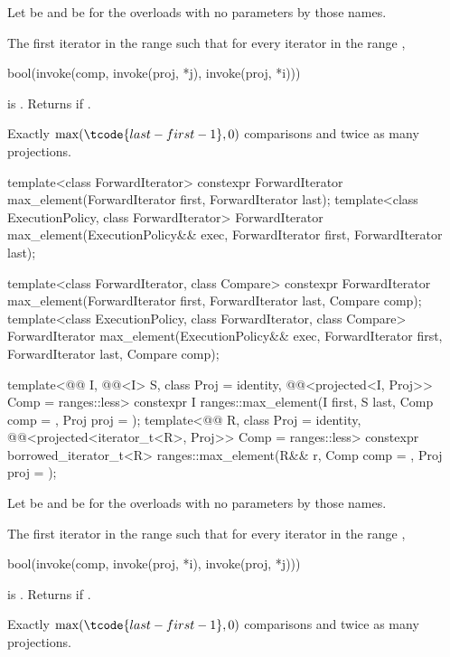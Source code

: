 \begin{itemdescr}
\pnum
Let  be 
and  be 
for the overloads with no parameters by those names.

\pnum
\returns
The first iterator  in the range 
such that for every iterator  in the range ,
\begin{codeblock}
bool(invoke(comp, invoke(proj, *j), invoke(proj, *i)))
\end{codeblock}
is .
Returns  if .

\pnum
\complexity
Exactly $\max(\tcode{last - first - 1}, 0)$ comparisons and
twice as many projections.
\end{itemdescr}

%
\begin{itemdecl}
template<class ForwardIterator>
  constexpr ForwardIterator max_element(ForwardIterator first, ForwardIterator last);
template<class ExecutionPolicy, class ForwardIterator>
  ForwardIterator max_element(ExecutionPolicy&& exec,
                              ForwardIterator first, ForwardIterator last);

template<class ForwardIterator, class Compare>
  constexpr ForwardIterator max_element(ForwardIterator first, ForwardIterator last,
                                        Compare comp);
template<class ExecutionPolicy, class ForwardIterator, class Compare>
  ForwardIterator max_element(ExecutionPolicy&& exec,
                              ForwardIterator first, ForwardIterator last,
                              Compare comp);

template<@@ I, @@<I> S, class Proj = identity,
         @@<projected<I, Proj>> Comp = ranges::less>
  constexpr I ranges::max_element(I first, S last, Comp comp = {}, Proj proj = {});
template<@@ R, class Proj = identity,
         @@<projected<iterator_t<R>, Proj>> Comp = ranges::less>
  constexpr borrowed_iterator_t<R>
    ranges::max_element(R&& r, Comp comp = {}, Proj proj = {});
\end{itemdecl}

\begin{itemdescr}
\pnum
Let  be 
and  be 
for the overloads with no parameters by those names.

\pnum
\returns
The first iterator  in the range 
such that for every iterator  in the range ,
\begin{codeblock}
bool(invoke(comp, invoke(proj, *i), invoke(proj, *j)))
\end{codeblock}
is .
Returns  if .

\pnum
\complexity
Exactly $\max(\tcode{last - first - 1}, 0)$ comparisons and
twice as many projections.
\end{itemdescr}

